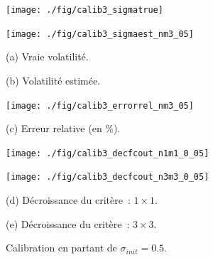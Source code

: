 \pagebreak

\begin{figure}[!htbp]

\begin{center}
\begin{minipage}{5.8cm}
\centerline{\texttt{[image: ./fig/calib3\_sigmatrue]}
} 
\end{minipage}
\hspace*{0.1cm}
\begin{minipage}{5.8cm}
\centerline{\texttt{[image: ./fig/calib3\_sigmaest\_nm3\_05]}
}
\end{minipage}
\end{center}

\begin{center}
\begin{minipage}{5.8cm}
(a) Vraie volatilit\'e.
\end{minipage}
\hspace*{0.1cm}
\begin{minipage}{5.8cm}
(b) Volatilit\'e estim\'ee.
\end{minipage}
\end{center}

\medskip

\begin{center}
\begin{minipage}{5.8cm}
\centerline{\texttt{[image: ./fig/calib3\_errorrel\_nm3\_05]}
}
\end{minipage}
\end{center}

\begin{center}
\begin{minipage}{5.8cm}
(c) Erreur relative (en \%).
\end{minipage}
\end{center}

\medskip

\begin{center}
\begin{minipage}{5.8cm}
\centerline{\texttt{[image: ./fig/calib3\_decfcout\_n1m1\_0\_05]}
}
\end{minipage}
\hspace*{0.1cm}
\begin{minipage}{5.8cm}
\centerline{\texttt{[image: ./fig/calib3\_decfcout\_n3m3\_0\_05]}
}
\end{minipage}
\end{center}

\begin{center}
\begin{minipage}{5.8cm}
(d) D\'ecroissance du crit\`ere~: $1 \times 1$.
\end{minipage}
\hspace*{0.1cm}
\begin{minipage}{5.8cm}
(e) D\'ecroissance du crit\`ere~: $3 \times 3$.
\end{minipage}
\end{center}

\caption{Calibration en partant de $\sigma_{init} = 0.5$.}
\label{FIG:CALIB3_NM3_05}
\end{figure}

